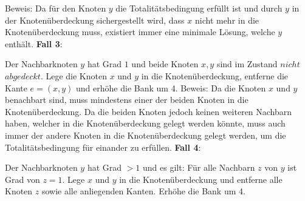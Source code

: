 \documentclass[12pt,onecolumn, notitlepage]{scrartcl}
\begin{document}
Beweis: Da für den Knoten $y$ die Totalitätsbedingung erfüllt ist und durch $y$ in der Knotenüberdeckung sichergestellt wird, dass $x$ nicht mehr in die Knotenüberdeckung muss, existiert immer eine minimale Lösung, welche $y$ enthält. \newline \newpage
\textbf{Fall 3}:\newline
\begin{center}
\end{center}
Der Nachbarknoten $y$ hat Grad $1$ und beide Knoten $x,y$ sind im Zustand $nicht$ $abgedeckt$. Lege die Knoten $x$ und $y$ in die Knotenüberdeckung, entferne die Kante $e = (x,y)$ und erhöhe die Bank um 4. \newline
Beweis: Da die Knoten $x$ und $y$ benachbart sind, muss mindestens einer der beiden Knoten in die Knotenüberdeckung. Da die beiden Knoten jedoch keinen weiteren Nachbarn haben, welcher in die Knotenüberdeckung gelegt werden könnte, muss auch immer der andere Knoten in die Knotenüberdeckung gelegt werden, um die Totalitätsbedingung für einander zu erfüllen.\newline \newline 
\textbf{Fall 4}:\newline
\begin{center}
\end{center}
Der Nachbarknoten $y$ hat Grad $>1$ und es gilt: Für alle Nachbarn $z$ von $y$ ist Grad von $z = 1$. Lege $x$ und $y$ in die Knotenüberdeckung und entferne alle Knoten $z$ sowie alle anliegenden Kanten. Erhöhe die Bank um 4.\newline
\end{document}
